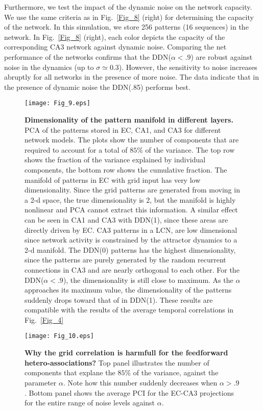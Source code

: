 \documentclass[utf8]{frontiersSCNS} %
\begin{document}
Furthermore, we test the impact of the dynamic noise on the network capacity. We use the same criteria as in Fig.~\ref{Fig_8} (right) for determining the capacity of the network. In this simulation, we store 256 patterns (16 sequences) in the network. 
%
In Fig.~\ref{Fig_8} (right), each color depicts the capacity of the corresponding CA3 network against dynamic noise.
%  
Comparing the net performance of the networks confirms that the DDN($\alpha < .9$) are robust against noise in the dynamics (up to $\sigma \simeq 0.3$). 
%
However, the sensitivity to noise increases abruptly for all networks in the presence of more noise. 
%
The data indicate that in the presence of dynamic noise the DDN(.85) performs best. 
%
\begin{figure}[!htb]
\centering\texttt{[image: Fig\_9.eps]}
\caption{\textbf{Dimensionality of the pattern manifold in different layers.} PCA of the patterns stored in EC, CA1, and CA3 for different network models. The plots show the number of components that are required to account for a total of $85 \%$ of the variance. The top row shows the fraction of the variance explained by individual components, the bottom row shows the cumulative fraction. The manifold of patterns in EC with grid input has very low dimensionality. Since the grid patterns are generated from moving in a 2-d space, the true dimensionality is 2, but the manifold is highly nonlinear and PCA cannot extract this information. A similar effect can be seen in CA1 and CA3 with DDN(1), since these areas are directly driven by EC. CA3 patterns in a LCN, are low dimensional since network activity is constrained by the attractor dynamics to a 2-d manifold. The DDN(0) patterns has the highest dimensionality, since the patterns are purely generated by the random recurrent connections in CA3 and are nearly orthogonal to each other. For the DDN($\alpha < .9$), the dimensionality is still close to maximum. As the $\alpha$ approaches its maximum value, the dimensionality of the patterns suddenly drops toward that of in DDN(1). These results are compatible with the results of the average temporal correlations in Fig.~\ref{Fig_4} }
\label{Fig_9}
\end{figure}


\begin{figure}[!htb]
\centering\texttt{[image: Fig\_10.eps]}
\caption{\textbf{Why the grid correlation is harmfull for the feedforward hetero-associations?} Top panel illustrates the number of components that explane the $85 \%$ of the variance, against the parameter $\alpha$. Note how this number suddenly decreases when $\alpha > .9$.
%
Bottom panel shows the average PCI for the EC-CA3 projections for the entire range of noise levels against $\alpha$.
} 
\label{Fig_10}
\end{figure}
\end{document}
